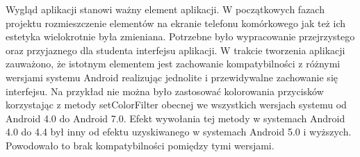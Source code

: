 \documentclass[archivemod, eng]{mgr}
\begin{document}
			Wygląd aplikacji stanowi ważny element aplikacji. W początkowych fazach projektu rozmieszczenie elementów na ekranie telefonu komórkowego jak też ich estetyka wielokrotnie była zmieniana. Potrzebne było wypracowanie przejrzystego oraz przyjaznego dla studenta interfejsu aplikacji. W trakcie tworzenia aplikacji zauważono, że istotnym elementem jest zachowanie kompatybilności z różnymi wersjami systemu Android realizując jednolite i przewidywalne zachowanie się interfejsu.
			Na przykład nie można było zastosować kolorowania przycisków korzystając z metody setColorFilter obecnej we wszystkich wersjach systemu od Android 4.0 do Android 7.0. Efekt wywołania tej metody w systemach Android 4.0 do 4.4 był inny od efektu uzyskiwanego w systemach Android 5.0 i wyższych. Powodowało to brak kompatybilności pomiędzy tymi wersjami.\\
		
			\pagebreak
		
\end{document}

